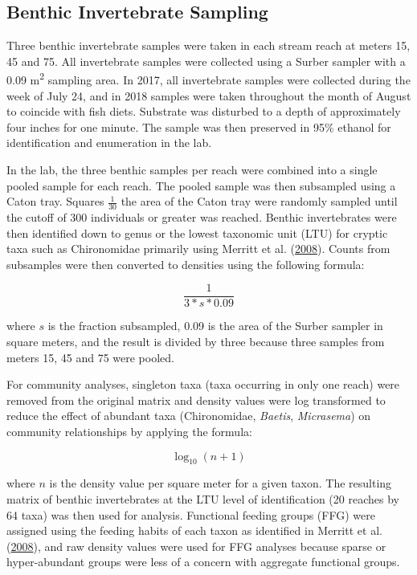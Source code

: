 \documentclass[double,12pt]{beavtex}
\begin{document}
  \subsection*{Benthic Invertebrate
  Sampling}\label{benthic-invertebrate-sampling}
  
  Three benthic invertebrate samples were taken in each stream reach at
  meters 15, 45 and 75. All invertebrate samples were collected using a
  Surber sampler with a 0.09 m\textsuperscript{2} sampling area. In 2017,
  all invertebrate samples were collected during the week of July 24, and
  in 2018 samples were taken throughout the month of August to coincide
  with fish diets. Substrate was disturbed to a depth of approximately
  four inches for one minute. The sample was then preserved in 95\%
  ethanol for identification and enumeration in the lab.
  
  In the lab, the three benthic samples per reach were combined into a
  single pooled sample for each reach. The pooled sample was then
  subsampled using a Caton tray. Squares \(\frac{1} {30}\) the area of the
  Caton tray were randomly sampled until the cutoff of 300 individuals or
  greater was reached. Benthic invertebrates were then identified down to
  genus or the lowest taxonomic unit (LTU) for cryptic taxa such as
  Chironomidae primarily using Merritt et al.
  (\protect\hyperlink{ref-Merritt2008}{2008}). Counts from subsamples were
  then converted to densities using the following formula:
  
  \begin{equation}
  \frac{1}{3*s*0.09}
  \end{equation}
  
  where \(s\) is the fraction subsampled, 0.09 is the area of the Surber
  sampler in square meters, and the result is divided by three because
  three samples from meters 15, 45 and 75 were pooled.
  
  For community analyses, singleton taxa (taxa occurring in only one
  reach) were removed from the original matrix and density values were log
  transformed to reduce the effect of abundant taxa (Chironomidae,
  \emph{Baetis}, \emph{Micrasema}) on community relationships by applying
  the formula:
  
  \begin{equation}
  \log_{10}(n + 1)
  \end{equation}
  
  where \(n\) is the density value per square meter for a given taxon. The
  resulting matrix of benthic invertebrates at the LTU level of
  identification (20 reaches by 64 taxa) was then used for analysis.
  Functional feeding groups (FFG) were assigned using the feeding habits
  of each taxon as identified in Merritt et al.
  (\protect\hyperlink{ref-Merritt2008}{2008}), and raw density values were
  used for FFG analyses because sparse or hyper-abundant groups were less
  of a concern with aggregate functional groups.
  
\end{document}
